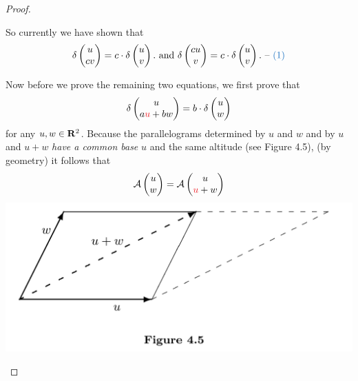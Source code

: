 \begin{proof}
\begin{enumerate}
So currently we have shown that
\[
    \delta \begin{pmatrix}
        u \\ cv
    \end{pmatrix}
    = c \cdot \delta \begin{pmatrix}
        u \\ v
    \end{pmatrix}.
    \text{ and }
    \delta \begin{pmatrix}
        cu \\ v
    \end{pmatrix}
    = c \cdot \delta \begin{pmatrix}
        u \\ v
    \end{pmatrix}. \text{ -- \BLUE{(1)}}
\]

Now before we prove the remaining two equations, we first prove that
\[
    \delta \begin{pmatrix}
        u \\ a\RED{u} + bw
    \end{pmatrix}
    = b \cdot \delta \begin{pmatrix}
        u \\ w
    \end{pmatrix}
\]
for any \(u, w \in \mathbf{R}^2\).
Because the parallelograms determined by \(u\) and \(w\) and by \(u\) and \(u + w\) \emph{have a common base} \(u\) and the same altitude (see Figure 4.5), (by geometry) it follows that
\[
    \mathcal{A} \begin{pmatrix}
        u \\ w
    \end{pmatrix}
    = \mathcal{A} \begin{pmatrix}
        u \\ \RED{u} + w
    \end{pmatrix}
\]
\includegraphics[width=14cm]{images/figure-4-5.png}


\end{enumerate}
\end{proof}
